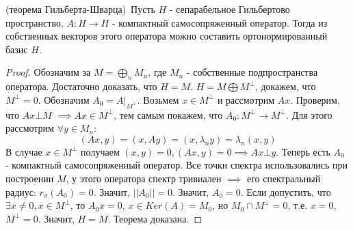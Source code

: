 \begin{theorem}(теорема Гильберта-Шварца)\
    Пусть $H$ - сепарабельное Гильбертово пространство, $A: H \rightarrow H$ - компактный самосопряженный оператор. Тогда из собственных векторов этого оператора можно составить ортонормированный базис $H$.
\end{theorem}
\begin{proof}
     Обозначим за  $M = \displaystyle\bigoplus_{n} M_{n}$, где $M_{n}$ - собственные подпространства оператора. Достаточно доказать, что $H = M$. $H = M \bigoplus M^{\bot}$, докажем, что $M^{\bot} = {0}$.\newline
     Обозначим $A_0 = A|_{M^{\bot}}$. Возьмем $x \in M^{\bot}$ и рассмотрим $Ax$. Проверим, что $Ax \bot M$ $\implies Ax \in M^{\bot}$, тем самым покажем, что $A_0: M^{\bot} \rightarrow M^{\bot}$. Для этого рассмотрим $\forall y \in M_n$:
     $$(Ax, y) = (x, Ay) = (x, \lambda_n y) = \lambda_n (x, y) $$
     В случае $x \in M^{\bot}$ получаем $(x, y) = 0, (Ax, y) = 0 \implies Ax \bot y$.\newline
     Теперь есть $A_0$ - компактный самосопряженный оператор. Все точки спектра использовались при построении $M$, у этого оператора спектр тривиален $\implies$ его спектральный радиус: $r_\sigma(A_0) = 0$. Значит, $||A_0|| = 0.$ Значит, $A_0 = 0$.\newline
     Если допустить, что $\exists x \not = 0, x\in M^{\bot}$, то $A_0 x = 0$, $x \in Ker(A) = M_0$, но $M_0 \cap M^{\bot} = {0}$, т.е. $x = 0$, $M^{\bot} = {0}$.\newline
     Значит, $H = M$. Теорема доказана. 
\end{proof}    
\pagebreak